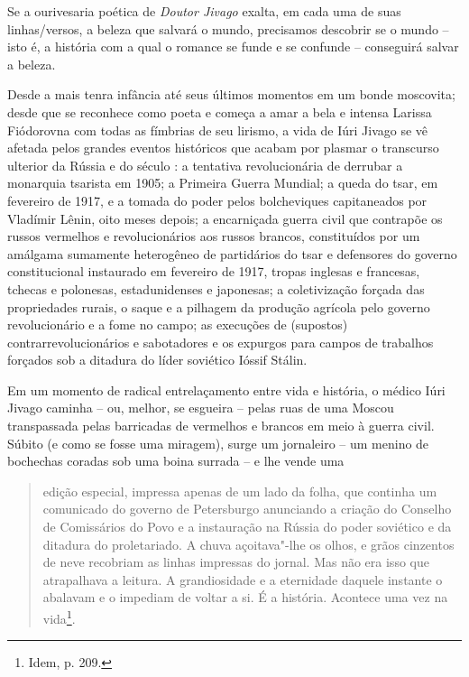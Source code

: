 Se a ourivesaria poética de \emph{Doutor Jivago} exalta, em cada uma de
suas linhas/versos, a beleza que salvará o mundo, precisamos descobrir
se o mundo -- isto é, a história com a qual o romance se funde e se
confunde -- conseguirá salvar a beleza.

Desde a mais tenra infância até seus últimos momentos em um bonde
moscovita; desde que se reconhece como poeta e começa a amar a bela e
intensa Larissa Fiódorovna com todas as fímbrias de seu lirismo, a vida
de Iúri Jivago se vê afetada pelos grandes eventos históricos que acabam
por plasmar o transcurso ulterior da Rússia e do século : a tentativa
revolucionária de derrubar a monarquia tsarista em 1905; a Primeira
Guerra Mundial; a queda do tsar, em fevereiro de 1917, e a tomada do
poder pelos bolcheviques capitaneados por Vladímir Lênin, oito meses
depois; a encarniçada guerra civil que contrapõe os russos vermelhos e
revolucionários aos russos brancos, constituídos por um amálgama
sumamente heterogêneo de partidários do tsar e defensores do governo
constitucional instaurado em fevereiro de 1917, tropas inglesas e
francesas, tchecas e polonesas, estadunidenses e japonesas; a
coletivização forçada das propriedades rurais, o saque e a pilhagem da
produção agrícola pelo governo revolucionário e a fome no campo; as
execuções de (supostos) contrarrevolucionários e sabotadores e os
expurgos para campos de trabalhos forçados sob a ditadura do líder
soviético Ióssif Stálin.

Em um momento de radical entrelaçamento entre vida e história, o médico
Iúri Jivago caminha -- ou, melhor, se esgueira -- pelas ruas de uma
Moscou transpassada pelas barricadas de vermelhos e brancos em meio à
guerra civil. Súbito (e como se fosse uma miragem), surge um jornaleiro
-- um menino de bochechas coradas sob uma boina surrada -- e lhe vende
uma

\begin{quote}
edição especial, impressa apenas de um lado da folha, que continha um
comunicado do governo de Petersburgo anunciando a criação do Conselho de
Comissários do Povo e a instauração na Rússia do poder soviético e da
ditadura do proletariado. A chuva açoitava"-lhe os olhos, e grãos
cinzentos de neve recobriam as linhas impressas do jornal. Mas não era
isso que atrapalhava a leitura. A grandiosidade e a eternidade daquele
instante o abalavam e o impediam de voltar a si. É a história. Acontece
uma vez na vida\footnote{Idem, p. 209.}.
\end{quote}

